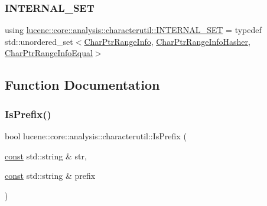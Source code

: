 \subsubsection{\texorpdfstring{I\+N\+T\+E\+R\+N\+A\+L\+\_\+\+S\+ET}{INTERNAL\_SET}}
{\footnotesize\ttfamily using \mbox{\hyperlink{namespacelucene_1_1core_1_1analysis_1_1characterutil_a2b64bd3cca4a8e9112fcbfaebc68aeee}{lucene\+::core\+::analysis\+::characterutil\+::\+I\+N\+T\+E\+R\+N\+A\+L\+\_\+\+S\+ET}} = typedef std\+::unordered\+\_\+set$<$\mbox{\hyperlink{classlucene_1_1core_1_1analysis_1_1characterutil_1_1CharPtrRangeInfo}{Char\+Ptr\+Range\+Info}}, \mbox{\hyperlink{classlucene_1_1core_1_1analysis_1_1characterutil_1_1CharPtrRangeInfoHasher}{Char\+Ptr\+Range\+Info\+Hasher}}, \mbox{\hyperlink{classlucene_1_1core_1_1analysis_1_1characterutil_1_1CharPtrRangeInfoEqual}{Char\+Ptr\+Range\+Info\+Equal}}$>$}



\subsection{Function Documentation}
\mbox{\label{namespacelucene_1_1core_1_1analysis_1_1characterutil_a95456ad6dbf1995507914b6b32fca8df}} 
\subsubsection{\texorpdfstring{Is\+Prefix()}{IsPrefix()}}
{\footnotesize\ttfamily bool lucene\+::core\+::analysis\+::characterutil\+::\+Is\+Prefix (\begin{DoxyParamCaption}\item[{\mbox{\hyperlink{ZlibCrc32_8h_a2c212835823e3c54a8ab6d95c652660e}{const}} std\+::string \&}]{str,  }\item[{\mbox{\hyperlink{ZlibCrc32_8h_a2c212835823e3c54a8ab6d95c652660e}{const}} std\+::string \&}]{prefix }\end{DoxyParamCaption})}

\mbox{\label{namespacelucene_1_1core_1_1analysis_1_1characterutil_a9f1e4e8422bdc82acbdd2170e3123271}} 
